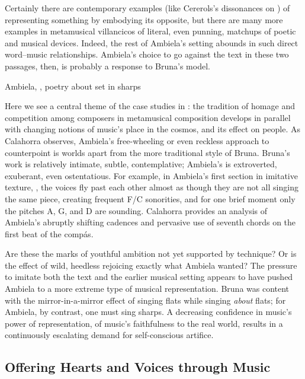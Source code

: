 Certainly there are contemporary examples (like Cererols's dissonances on
) of representing something by embodying its
opposite, but there are many more examples in metamusical villancicos of
literal, even punning, matchups of poetic and musical devices. 
Indeed, the rest of Ambiela's setting abounds in such direct word--music
relationships.
Ambiela's choice to go against the text in these two passages, then, is
probably a response to Bruna's model.

{Ambiela, , poetry about  set in sharps}

Here we see a central theme of the case studies in
: the tradition of homage and competition among
composers in metamusical composition develops in parallel with changing notions
of music's place in the cosmos, and its effect on people.
As Calahorra observes, Ambiela's free-wheeling or even reckless approach to
counterpoint is worlds apart from the more traditional style of Bruna.
Bruna's work is relatively intimate, subtle, contemplative; Ambiela's is
extroverted, exuberant, even ostentatious.
For example, in Ambiela's first section in imitative texture, ,
the voices fly past each other almost as though they are not all singing the
same piece, creating frequent F\na{}/C\sh{} sonorities, and for one brief
moment only the pitches A, G, and D are sounding.
Calahorra provides an analysis of Ambiela's abruptly shifting cadences and
pervasive use of seventh chords on the first beat of the compás.

Are these the marks of youthful ambition not yet supported by technique?
Or is the effect of wild, heedless rejoicing exactly what Ambiela wanted?
The pressure to imitate both the text and the earlier musical setting appears
to have pushed Ambiela to a more extreme type of musical representation.
Bruna was content with the mirror-in-a-mirror effect of singing flats while
singing \emph{about} flats; for Ambiela, by contrast, one must sing sharps.
A decreasing confidence in music's power of representation, of music's
faithfulness to the real world, results in a continuously escalating demand for
self-conscious artifice.  

\subsection{Offering Hearts and Voices through Music}

